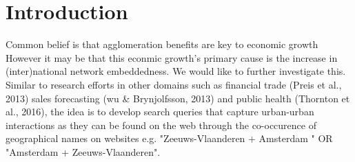 \section{Introduction}

Common belief is that agglomeration benefits are key to economic growth %
However it may be that this econmic growth's primary cause is the increase in (inter)national network embeddedness. 
We would like to further investigate this.
Similar to research efforts in other domains such as financial trade (Preis et al., 2013) sales forecasting (wu \& Brynjolfsson, 2013) and public health (Thornton et al., 2016), the idea is to develop search queries that capture urban-urban interactions as they can be found on the web through the co-occurence of geographical names on websites e.g. "Zeeuws-Vlaanderen + Amsterdam " OR "Amsterdam + Zeeuws-Vlaanderen". \\

